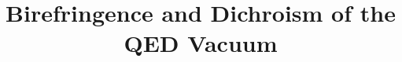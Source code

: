 
\def\jepsfbox#1{\typeout{#1} \epsfbox{#1}}
\def\plotone#1{\begin{center} \leavevmode
\epsfxsize=0.7\columnwidth \jepsfbox{#1} \end{center}}
%
\def\jcite#1#2{#1 \cite{#2}}
\def\tilde{\mathaccent"365}			%
%
\def\rarrow{\rightarrow}
\def\eg{{\it e.g.~}}
\def\ie{{\it i.e.~}}
\def\cf{{\it c.f.~}}
\def\etc{{\it etc.~}}
\def\etal{{\it et al.~}}
%
\def\rmmat#1{{\hbox{\rm #1}}}
\def\rmscr#1{\rmmat{\scriptsize #1}}
%
\newcommand{\be}{\begin{equation}}
\newcommand{\ee}{\end{equation}}
\newcommand{\ba}{\begin{eqnarray}}
\newcommand{\ea}{\end{eqnarray}}
%
\def\p{\partial}
\def\d{{\rm d}}
\def\der#1#2{{\d#1\over\d#2}}
\def\dd#1#2{\frac{\d #1}{\d #2}}
\def\pp#1#2{\frac{\p #1}{\p #2}}
%
\def\sech{ {\rm sech}} %
\def\csch{ {\rm csch}} %
\def\arccot{{\rm arccot}} %
\def\arcsec{{\rm arcsec}} %
\def\arccsc{{\rm arccsc}} %
\def\arcsinh{{\rm arcsinh}} %
\def\arccosh{{\rm arccosh}} %
\def\arctanh{{\rm arctanh}} %
\def\arccoth{{\rm arccoth}} %
\def\arcsech{{\rm arcsech}} %
\def\arccsch{{\rm arccsch}} %
\def\erf{{\rm erf}} %
%
\def\IM{{\rm Im}}   %
\def\RE{{\rm Re}}   %
\def\figref#1{Fig.~\ref{fig:#1}}
\def\eqref#1{Eq.~\ref{eq:#1}}
%

\draft
\newcommand{\bfi}{{\bf B}}
\newcommand{\efi}{{\bf E}}
\newcommand{\dfi}{{\bf D}}
\newcommand{\hfi}{{\bf H}}
\newcommand{\lag}{{\cal L}}
\newcommand{\dLIII}{{\frac{\partial^3 \lag}{\partial I^3}}}
\newcommand{\dLII}{{\frac{\partial^2 \lag}{\partial I^2}}}
\newcommand{\dLI}{{\frac{\partial \lag}{\partial I}}}
\newcommand{\dLKKK}{{\frac{\partial^3 \lag}{\partial K^3}}}
\newcommand{\dLKK}{{\frac{\partial^2 \lag}{\partial K^2}}}
\newcommand{\dLK}{{\frac{\partial \lag}{\partial K}}}
\newcommand{\dLIK}{{\frac{\partial^2 \lag}{\partial I \partial K}}}
\title{Birefringence and Dichroism of the QED Vacuum}

